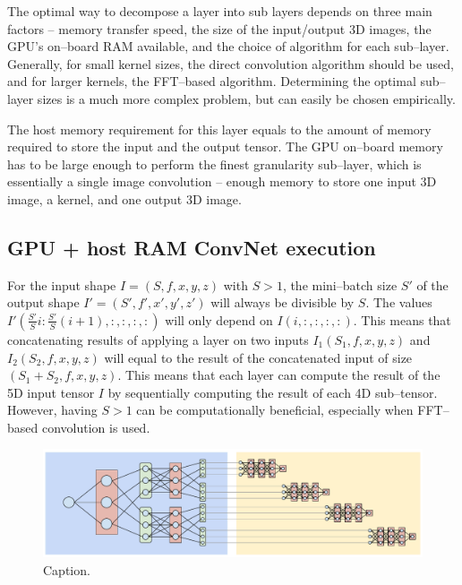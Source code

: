 \documentclass[conference]{./IEEEtran/IEEEtran}
\begin{document}
  The optimal way to decompose a layer into sub layers depends on
  three main factors -- memory transfer speed, the size of the
  input/output 3D images, the GPU's on--board RAM available, and the
  choice of algorithm for each sub--layer.  Generally, for small
  kernel sizes, the direct convolution algorithm should be used, and
  for larger kernels, the FFT--based algorithm.  Determining the
  optimal sub--layer sizes is a much more complex problem, but can
  easily be chosen empirically.

  The host memory requirement for this layer equals to the amount of
  memory required to store the input and the output tensor.  The GPU
  on--board memory has to be large enough to perform the finest
  granularity sub--layer, which is essentially a single image
  convolution -- enough memory to store one input 3D image, a kernel,
  and one output 3D image.

\subsection{GPU + host RAM ConvNet execution}
  For the input shape $I = (S,f,x,y,z)$ with $S > 1$, the mini--batch
  size $S'$ of the output shape $I' = (S',f',x',y',z')$ will always be
  divisible by $S$.  The values $I'(\frac{S'}{S} i : \frac{S'}{S}
  (i+1),:,:,:,:)$ will only depend on $I(i,:,:,:,:)$.  This means that
  concatenating results of applying a layer on two inputs
  $I_1(S_1,f,x,y,z)$ and $I_2(S_2,f,x,y,z)$ will equal to the result
  of the concatenated input of size $(S_1+S_2,f,x,y,z)$.  This means
  that each layer can compute the result of the 5D input tensor $I$ by
  sequentially computing the result of each 4D sub--tensor.  However,
  having $S > 1$ can be computationally beneficial, especially when
  FFT--based convolution is used.



  \begin{figure}
    \begin{center}
      \includegraphics[width=0.99\columnwidth]{fig/layer_vs_batch.pdf}
    \end{center}
    \caption{Caption.}
    \label{fig:layer-vs-batch}
  \end{figure}
\end{document}

